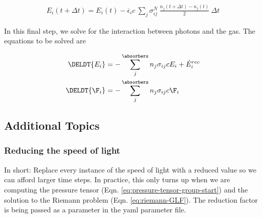 \begin{align}
    E_i (t + \Delta t) 
        = E_i(t) - \overline{\epsilon}_i c \ \sum_j \sigma_{i j} ^ N  \
    \frac{n_j(t + \Delta t) - n_j(t)}{2} \ \Delta t
\end{align}





In this final step, we solve for the interaction between photons and the gas.
The equations to be solved are

\begin{align}
	\DELDT{E_i}  &=
		- \sum\limits_{j}^{\absorbers} n_j \sigma_{i j} c E_i + \dot E_i ^{rec} \label{eq:thermochemistry-E} \\
	\DELDT{\F_i} &=
		- \sum\limits_{j}^{\absorbers} n_j \sigma_{i j} c \F_i \label{eq:thermochemistry-F}
\end{align}












\subsection{Additional Topics}


\subsubsection{Reducing the speed of light}

In short: Replace every instance of the speed of light with a reduced value so we can afford larger
time steps. In practice, this only turns up when we are computing the pressure tensor (Eqn.
\ref{eq:pressure-tensor-group-start}) and the solution to the Riemann problem (Eqn.
\ref{eq:riemann-GLF}). The reduction factor is being passed as a parameter in the yaml parameter
file.


%
%
%





